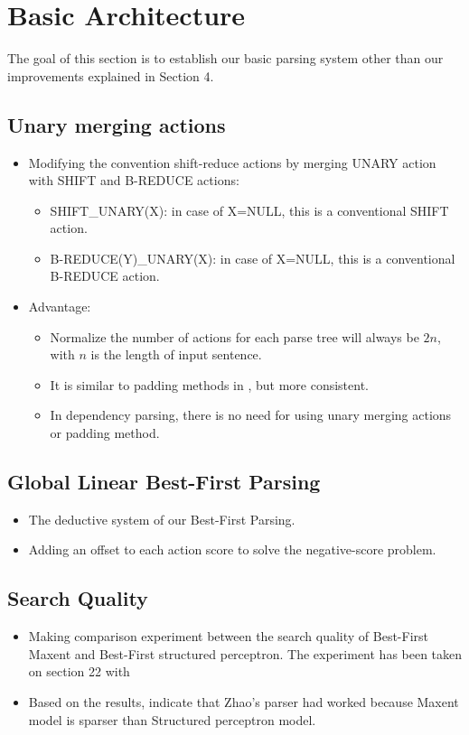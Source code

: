 \section{Basic Architecture}
	The goal of this section is to establish our basic parsing system other than our improvements explained in Section 4.
\subsection{Unary merging actions}
	\begin{itemize}
		\item Modifying the convention shift-reduce actions by merging UNARY action with SHIFT and B-REDUCE actions:
			\begin{itemize}
				\item SHIFT\_UNARY(X): in case of X=NULL, this is a conventional SHIFT action.
				\item B-REDUCE(Y)\_UNARY(X): in case of X=NULL, this is a conventional B-REDUCE action.
			\end{itemize}
		\item Advantage: 
			\begin{itemize}
				\item Normalize the number of actions for each parse tree will always be $2n$, with $n$ is the length of input sentence.
				\item It is similar to padding methods in \cite{2012Zhu}, but more consistent.
				\item In dependency parsing, there is no need for using unary merging actions or padding method.
			\end{itemize}
	\end{itemize}
\subsection{Global Linear Best-First Parsing}
	\begin{itemize}
		\item The deductive system of our Best-First Parsing.
		\item Adding an offset to each action score to solve the negative-score problem.
	\end{itemize}
\subsection{Search Quality}
	\begin{itemize}
		\item Making comparison experiment between the search quality of Best-First Maxent and Best-First structured perceptron. The experiment has been taken on section 22 with 
		\item Based on the results, indicate that Zhao's parser had worked because Maxent model is sparser than Structured perceptron model.
	\end{itemize}